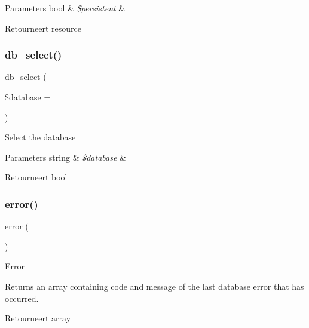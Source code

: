 \begin{DoxyParams}[1]{Parameters}
bool & {\em \$persistent} & \\
\hline
\end{DoxyParams}
\begin{DoxyReturn}{Retourneert}
resource 
\end{DoxyReturn}
\mbox{\label{class_c_i___d_b__mysql__driver_a18ae9c21870b30b45337c5e3626190cc}} 
\subsubsection{\texorpdfstring{db\_select()}{db\_select()}}
{\footnotesize\ttfamily db\+\_\+select (\begin{DoxyParamCaption}\item[{}]{\$database = {\ttfamily \textquotesingle{}\textquotesingle{}} }\end{DoxyParamCaption})}

Select the database


\begin{DoxyParams}[1]{Parameters}
string & {\em \$database} & \\
\hline
\end{DoxyParams}
\begin{DoxyReturn}{Retourneert}
bool 
\end{DoxyReturn}
\mbox{\label{class_c_i___d_b__mysql__driver_a43b8d30b879d4f09ceb059b02af2bc02}} 
\subsubsection{\texorpdfstring{error()}{error()}}
{\footnotesize\ttfamily error (\begin{DoxyParamCaption}{ }\end{DoxyParamCaption})}

Error

Returns an array containing code and message of the last database error that has occurred.

\begin{DoxyReturn}{Retourneert}
array 
\end{DoxyReturn}
\mbox{\label{class_c_i___d_b__mysql__driver_a90355121e1ed009e0efdbd544ab56efa}} 

